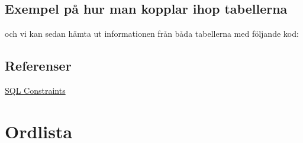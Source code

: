 \hypertarget{exempel-puxe5-hur-man-kopplar-ihop-tabellerna}{%
\subsection{Exempel på hur man kopplar ihop
tabellerna}\label{exempel-puxe5-hur-man-kopplar-ihop-tabellerna}}

\hypertarget{cb2}{}
\begin{Shaded}
\begin{Highlighting}[]
 
\NormalTok{ (}\NormalTok{, }\NormalTok{, }\NormalTok{, }\NormalTok{, }\NormalTok{);}
 
\NormalTok{ (}\NormalTok{, }\NormalTok{, }\NormalTok{);}
\end{Highlighting}
\end{Shaded}

och vi kan sedan hämta ut informationen från båda tabellerna med
följande kod:

\hypertarget{cb3}{}
\begin{Shaded}
\begin{Highlighting}[]
 \OperatorTok{*} 
 \OperatorTok{=}
\end{Highlighting}
\end{Shaded}

\hypertarget{referenser}{%
\subsection{Referenser}\label{referenser}}

\href{https://www.w3schools.com/sql/sql_constraints.asp}{SQL
Constraints}

\hypertarget{ordlista}{%
\section{Ordlista}\label{ordlista}}

